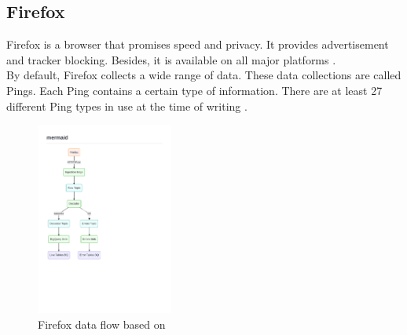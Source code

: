 \newpage
    \subsection{Firefox}
        Firefox is a browser that promises speed and privacy. It provides advertisement and tracker blocking. Besides, it is available on all major platforms \cite{mozilla_corporation_download_nodate}.\\ 
        By default, Firefox collects a wide range of data. These data collections are called Pings. Each Ping contains a certain type of information. There are at least 27 different Ping types in use at the time of writing \cite{mozilla_telemetry_nodate}.
        
        \begin{figure}
            \centering
            \includegraphics[clip, trim=0.5cm 8cm 8cm 3.5cm, width=0.4\textwidth]{latex/figures/firefox_telemetry_graph}
            \caption[Firefox data flow]{Firefox data flow based on  \cite{mozilla_overview_2020}}
            \label{fig:moz_data_flow}
        \end{figure}
        
